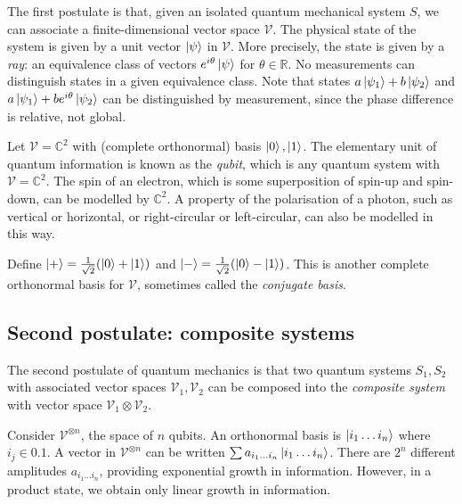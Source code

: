 The first postulate is that, given an isolated quantum mechanical system \( S \), we can associate a finite-dimensional vector space \( \mathcal V \).
The physical state of the system is given by a unit vector \( \ket{\psi} \) in \( \mathcal V \).
More precisely, the state is given by a \emph{ray}: an equivalence class of vectors \( e^{i\theta} \ket{\psi} \) for \( \theta \in \mathbb R \).
No measurements can distinguish states in a given equivalence class.
Note that states \( a\ket{\psi_1} + b\ket{\psi_2} \) and \( a\ket{\psi_1} + be^{i\theta}\ket{\psi_2} \) can be distinguished by measurement, since the phase difference is relative, not global.
\begin{example}
    Let \( \mathcal V = \mathbb C^2 \) with (complete orthonormal) basis \( \ket{0}, \ket{1} \).
    The elementary unit of quantum information is known as the \emph{qubit}, which is any quantum system with \( \mathcal V = \mathbb C^2 \).
    The spin of an electron, which is some superposition of spin-up and spin-down, can be modelled by \( \mathbb C^2 \).
    A property of the polarisation of a photon, such as vertical or horizontal, or right-circular or left-circular, can also be modelled in this way.

    Define \( \ket{+} = \frac{1}{\sqrt{2}}\qty(\ket{0} + \ket{1}) \) and \( \ket{-} = \frac{1}{\sqrt{2}}\qty(\ket{0} - \ket{1}) \).
    This is another complete orthonormal basis for \( \mathcal V \), sometimes called the \emph{conjugate basis}.
\end{example}

\subsection{Second postulate: composite systems}
The second postulate of quantum mechanics is that two quantum systems \( S_1, S_2 \) with associated vector spaces \( \mathcal V_1, \mathcal V_2 \) can be composed into the \emph{composite system} with vector space \( \mathcal V_1 \otimes \mathcal V_2 \).
\begin{example}
    Consider \( \mathcal V^{\otimes n} \), the space of \( n \) qubits.
    An orthonormal basis is \( \ket{i_1 \dots i_n} \) where \( i_j \in \qty{0,1} \).
    A vector in \( \mathcal V^{\otimes n} \) can be written \( \sum a_{i_1 \dots i_n} \ket{i_1 \dots i_n} \).
    There are \( 2^n \) different amplitudes \( a_{i_1 \dots i_n} \), providing exponential growth in information.
    However, in a product state, we obtain only linear growth in information.
\end{example}

